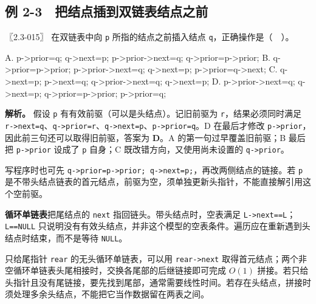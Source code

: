 \subsection{例 2-3　把结点插到双链表结点之前}\label{DS02-ex3}

\begin{example}[配套例题]

〖2.3-015〗 在双链表中向 \texttt{p} 所指的结点之前插入结点 \texttt{q}，正确操作是（　）。

\par\medskip\noindent\begin{minipage}{\linewidth}
\begin{codeblock}[language={}]
A. p->prior=q; q->next=p;
   p->prior->next=q; q->prior=p->prior;
B. q->prior=p->prior; p->prior->next=q;
   q->next=p; p->prior=q->next;
C. q->next=p; p->next=q;
   q->prior->next=q; q->next=p;
D. p->prior->next=q; q->next=p;
   q->prior=p->prior; p->prior=q;
\end{codeblock}
\end{minipage}\par\medskip

\end{example}

\textbf{解析。} 假设 \texttt{p} 有有效前驱（可以是头结点）。记旧前驱为 \texttt{r}，结果必须同时满足 \texttt{r->\allowbreak{}next=\allowbreak{}q}、\texttt{q->\allowbreak{}prior=\allowbreak{}r}、\texttt{q->\allowbreak{}next=\allowbreak{}p}、\texttt{p->\allowbreak{}prior=\allowbreak{}q}。D 在最后才修改 \texttt{p->\allowbreak{}prior}，因此前三句还可以取得旧前驱，答案为 \textbf{D}。A 的第一句过早覆盖旧前驱；B 最后把 \texttt{p->\allowbreak{}prior} 设成了 \texttt{p} 自身；C 既改错方向，又使用尚未设置的 \texttt{q->\allowbreak{}prior}。

写程序时也可先 \texttt{q->\allowbreak{}prior=\allowbreak{}p->\allowbreak{}prior;\allowbreak{} q->\allowbreak{}next=\allowbreak{}p;\allowbreak{}}，再改两侧结点的链接。若 \texttt{p} 是不带头结点链表的首元结点，前驱为空，须单独更新头指针，不能直接解引用这个空前驱。

\textbf{循环单链表}把尾结点的 \texttt{next} 指回链头。带头结点时，空表满足 \texttt{L->\allowbreak{}next=\allowbreak{}=\allowbreak{}L}；\texttt{L=\allowbreak{}=\allowbreak{}NULL} 只说明没有有效头结点，并非这个模型的空表条件。遍历应在重新遇到头结点时结束，而不是等待 \texttt{NULL}。

只给尾指针 \texttt{rear} 的无头循环单链表，可以用 \texttt{rear->\allowbreak{}next} 取得首元结点；两个非空循环单链表头尾相接时，交换各尾部的后继链接即可完成 \(O(1)\) 拼接。若只给头指针且没有尾链接，要先找到尾部，通常需要线性时间。若存在头结点，拼接时须处理多余头结点，不能把它当作数据留在两表之间。

